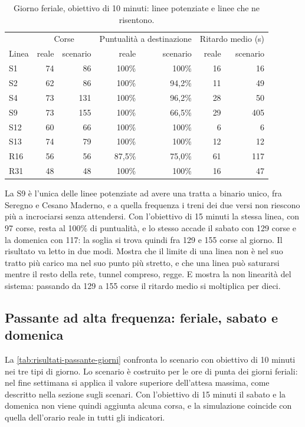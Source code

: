 \begin{table}[H]
	\centering
	\caption{Giorno feriale, obiettivo di 10 minuti: linee potenziate e linee che ne risentono.}
	\label{tab:risultati-linee}
	\begin{tabularx}{\textwidth}{Xrrrrrr}
		\toprule
		 & \multicolumn{2}{c}{Corse} & \multicolumn{2}{c}{Puntualità a destinazione} & \multicolumn{2}{c}{Ritardo medio (s)} \\
		Linea & reale & scenario & reale & scenario & reale & scenario \\
		\midrule
		S1 & 74 & 86 & 100\% & 100\% & 16 & 16 \\
		S2 & 62 & 86 & 100\% & 94,2\% & 11 & 49 \\
		S4 & 73 & 131 & 100\% & 96,2\% & 28 & 50 \\
		S9 & 73 & 155 & 100\% & 66,5\% & 29 & 405 \\
		S12 & 60 & 66 & 100\% & 100\% & 6 & 6 \\
		S13 & 74 & 79 & 100\% & 100\% & 12 & 12 \\
		\midrule
		R16 & 56 & 56 & 87,5\% & 75,0\% & 61 & 117 \\
		R31 & 48 & 48 & 100\% & 100\% & 16 & 47 \\
		\bottomrule
	\end{tabularx}
\end{table}

La S9 è l'unica delle linee potenziate ad avere una tratta a binario unico, fra Seregno e Cesano Maderno, e a quella frequenza i treni dei due versi non riescono più a incrociarsi senza attendersi. Con l'obiettivo di 15 minuti la stessa linea, con 97 corse, resta al 100\% di puntualità, e lo stesso accade il sabato con 129 corse e la domenica con 117: la soglia si trova quindi fra 129 e 155 corse al giorno. Il risultato va letto in due modi. Mostra che il limite di una linea non è nel suo tratto più carico ma nel suo punto più stretto, e che una linea può saturarsi mentre il resto della rete, tunnel compreso, regge. E mostra la non linearità del sistema: passando da 129 a 155 corse il ritardo medio si moltiplica per dieci.

\subsection{Passante ad alta frequenza: feriale, sabato e domenica}
La \cref{tab:risultati-passante-giorni} confronta lo scenario con obiettivo di 10 minuti nei tre tipi di giorno. Lo scenario è costruito per le ore di punta dei giorni feriali: nel fine settimana si applica il valore superiore dell'attesa massima, come descritto nella sezione sugli scenari. Con l'obiettivo di 15 minuti il sabato e la domenica non viene quindi aggiunta alcuna corsa, e la simulazione coincide con quella dell'orario reale in tutti gli indicatori.

